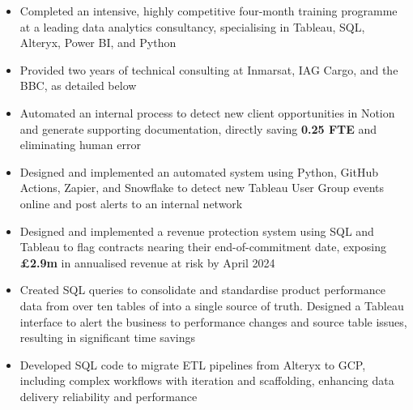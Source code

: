 \begin{paracol}{2}

\begin{itemize}
\item Completed an intensive, highly competitive four-month training programme at a leading data analytics consultancy, specialising in Tableau, SQL, Alteryx, Power BI, and Python
\item Provided two years of technical consulting at Inmarsat, IAG Cargo, and the BBC, as detailed below
\item Automated an internal process to detect new client opportunities in Notion and generate supporting documentation, directly saving \textbf{0.25 FTE} and eliminating human error
\item Designed and implemented an automated system using Python, GitHub Actions, Zapier, and Snowflake to detect new Tableau User Group events online and post alerts to an internal network

\medskip
{}

\end{itemize}

\divider


\begin{itemize}
\item Designed and implemented a revenue protection system using SQL and Tableau to flag contracts nearing their end-of-commitment date, exposing \textbf{£2.9m} in annualised revenue at risk by April 2024
\item Created SQL queries to consolidate and standardise product performance data from over ten tables of into a single source of truth. Designed a Tableau interface to alert the business to performance changes and source table issues, resulting in significant time savings
\item Developed SQL code to migrate ETL pipelines from Alteryx to GCP, including complex workflows with iteration and scaffolding, enhancing data delivery reliability and performance


\end{itemize}
\end{paracol}
